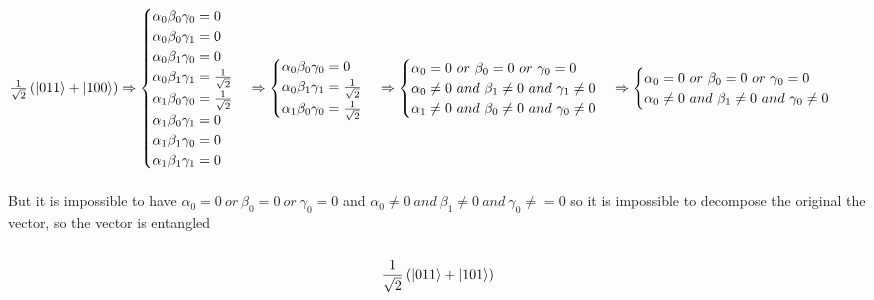 \documentclass{article}
\DeclarePairedDelimiter\ket{\lvert}{\rangle}
\begin{document}
\(
\frac{1}{\sqrt{2}} \left(\ket{011} + \ket{100}\right) \Rightarrow \begin{cases} 
\alpha_{0} \beta_{0} \gamma_{0} = 0 \\
\alpha_{0} \beta_{0} \gamma_{1}  = 0 \\
\alpha_{0} \beta_{1} \gamma_{0}  = 0 \\
\alpha_{0} \beta_{1} \gamma_{1}  = \frac{1}{\sqrt{2}} \\
\alpha_{1} \beta_{0} \gamma_{0}  = \frac{1}{\sqrt{2}} \\
\alpha_{1} \beta_{0} \gamma_{1}  = 0 \\
\alpha_{1} \beta_{1} \gamma_{0}  = 0 \\
\alpha_{1} \beta_{1} \gamma_{1} = 0
\end{cases}
\Rightarrow
\begin{cases} 
\alpha_{0} \beta_{0} \gamma_{0} = 0 \\
\alpha_{0} \beta_{1} \gamma_{1} = \frac{1}{\sqrt{2}} \\
\alpha_{1} \beta_{0} \gamma_{0} = \frac{1}{\sqrt{2}} \\
\end{cases}
\Rightarrow
\begin{cases} 
\alpha_{0} = 0 ~or~ \beta_{0} = 0 ~or~ \gamma_{0} = 0 \\
\alpha_{0} \neq 0 ~and~ \beta_{1} \neq 0 ~and~ \gamma_{1} \neq 0 \\
\alpha_{1} \neq 0 ~and~ \beta_{0} \neq 0 ~and~ \gamma_{0} \neq 0 \\
\end{cases}
\Rightarrow
\begin{cases} 
\alpha_{0} = 0 ~or~ \beta_{0} = 0 ~or~ \gamma_{0} = 0 \\
\alpha_{0} \neq 0 ~and~ \beta_{1} \neq 0 ~and~ \gamma_{0} \neq 0 \\
\end{cases}
\)
\\
\\

But it is impossible to have \(\alpha_{0} = 0 ~or~ \beta_{0} = 0 ~or~ \gamma_{0} = 0\) and \(\alpha_{0} \neq 0 ~and~ \beta_{1} \neq 0 ~and~ \gamma_{0} \neq = 0\) so it is impossible to decompose the original the vector, so the vector is entangled
\\
\\
\[
\frac{1}{\sqrt{2}} \left(\ket{011} + \ket{101}\right)
\] 
\end{document}
